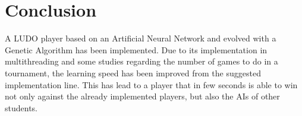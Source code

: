 \section{Conclusion} %
\label{sec:conclusion}
A LUDO player based on an Artificial Neural Network and evolved with a Genetic Algorithm has been implemented.
Due to its implementation in multithreading and some studies regarding the number of games to do in a tournament, the learning speed has been improved from the suggested implementation line.
This has lead to a player that in few seconds is able to win not only against the already implemented players, but also the AIs of other students.
